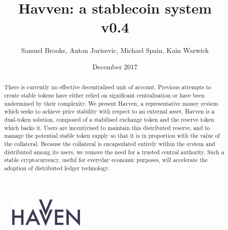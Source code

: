 \documentclass{article}
\theoremstyle{definition}
\theoremstyle{plain} %
\begin{document}
\newcommand{\HAV}{\textsc{hav}}
\newcommand{\NOM}{\textsc{nom}}


\title{Havven: a stablecoin system\\ v0.4}
\author{Samuel Brooks, Anton Jurisevic, Michael Spain, Kain Warwick}
\date{December 2017}


\begin{figure}
    \centering
    \includegraphics[width=0.33\textwidth]{img/havvenlogo}
\end{figure}
\maketitle

\hfill

\begin{abstract}
\noindent There is currently no effective decentralised unit of account. Previous attempts to create
stable tokens have either relied on significant centralisation or have been undermined by their
complexity. We present Havven, a representative money system which seeks to achieve price
stability with respect to an external asset.
Havven is a dual-token solution, composed of a
stabilised exchange token and the reserve token which backs it. Users are incentivised to maintain
this distributed reserve, and to manage the potential stable token supply so that it is in
proportion with the value of the collateral. Because the collateral is encapsulated entirely within
the system and distributed among its users, we remove the need for a trusted central authority.
Such a stable cryptocurrency, useful for everyday economic purposes, will accelerate the adoption of
distributed ledger technology.
\end{abstract}	


\pagebreak 

\tableofcontents


\pagebreak


%



%
%

%
%
\end{document}
